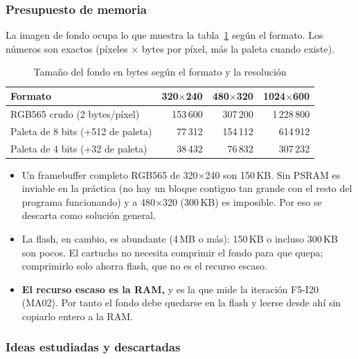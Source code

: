 \subsubsection{Presupuesto de memoria}

La imagen de fondo ocupa lo que muestra la tabla~\ref{tab:F6I91Tamanos} según el formato. Los números son exactos (píxeles $\times$ bytes por píxel, más la paleta cuando existe).

\begin{table}[H]
	\centering
	\begin{tabular}{lrrr}
		\toprule
		Formato & 320$\times$240 & 480$\times$320 & 1024$\times$600 \\
		\midrule
		RGB565 crudo (2 bytes/píxel) & 153\,600 & 307\,200 & 1\,228\,800 \\
		Paleta de 8 bits (+512 de paleta) & 77\,312 & 154\,112 & 614\,912 \\
		Paleta de 4 bits (+32 de paleta) & 38\,432 & 76\,832 & 307\,232 \\
		\bottomrule
	\end{tabular}
	\caption{Tamaño del fondo en bytes según el formato y la resolución}
	\label{tab:F6I91Tamanos}
\end{table}

\begin{itemize}
	\item Un framebuffer completo RGB565 de 320$\times$240 son 150\,KB. Sin PSRAM es inviable en la práctica (no hay un bloque contiguo tan grande con el resto del programa funcionando) y a 480$\times$320 (300\,KB) es imposible. Por eso se descarta como solución general.
	\item La flash, en cambio, es abundante (4\,MB o más): 150\,KB o incluso 300\,KB son pocos. El cartucho no necesita comprimir el fondo para que quepa; comprimirlo solo ahorra flash, que no es el recurso escaso.
	\item \textbf{El recurso escaso es la RAM,} y es la que mide la iteración F5-I20 (MA02). Por tanto el fondo debe quedarse en la flash y leerse desde ahí sin copiarlo entero a la RAM.
\end{itemize}

\subsubsection{Ideas estudiadas y descartadas}


